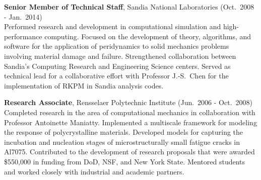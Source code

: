 \begin{minipage}{\minipagewidth}
%

\end{minipage}\vspace{\parskip}

\newpage
\pagestyle{fancy}
\cfoot{}
\setlength{\headheight}{\myheadheight}
\setlength{\topmargin}{\mytopmargin}

\begin{minipage}{\minipagewidth}
\textbf{Senior Member of Technical Staff}, Sandia National Laboratories (Oct.~2008 - Jan.~2014) \\
%
Performed research and development in computational simulation and high-performance computing.  Focused on the development of theory, algorithms, and software for the application of peridynamics to solid mechanics problems involving material damage and failure.  Strengthened collaboration between Sandia's Computing Research and Engineering Science centers. Served as technical lead for a collaborative effort with Professor J.-S.~Chen for the implementation of RKPM in Sandia analysis codes.
\end{minipage}\vspace{\parskip}

\begin{minipage}{\minipagewidth}
\textbf{Research Associate}, Rensselaer Polytechnic Institute (Jun.~2006 - Oct.~2008) \\
%
Completed research in the area of computational mechanics in collaboration with Professor Antoinette Maniatty.  Implemented a multiscale framework for modeling the response of polycrystalline materials.  Developed models for capturing the incubation and nucleation stages of microstructurally small fatigue cracks in Al7075.  Contributed to the development of research proposals that were awarded \$550,000 in funding from DoD, NSF, and New York State.  Mentored students and worked closely with industrial and academic partners.
\end{minipage}\vspace{\parskip}

